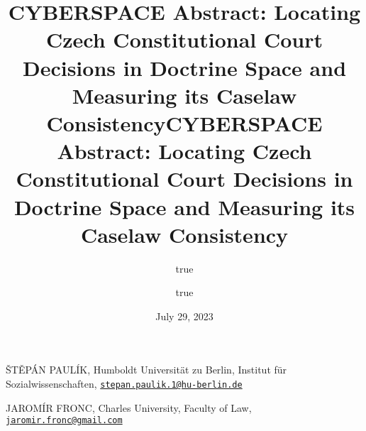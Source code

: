 \documentclass[
  11pt,
]{article}
\title{CYBERSPACE Abstract: Locating Czech Constitutional Court
Decisions in Doctrine Space and Measuring its Caselaw Consistency}
\author{true \and true}
\date{July 29, 2023}
\title{CYBERSPACE Abstract: Locating Czech Constitutional Court
Decisions in Doctrine Space and Measuring its Caselaw Consistency }
\date{}
\begin{document}



{%
\setlength{\parindent}{0pt}
\thispagestyle{plain}
{%
\maketitle  %

}




{
   \vskip 13.5pt\relax \normalsize\fontsize{11}{12}
   \MakeUppercase{Štěpán Paulík}, \small{Humboldt Universität zu Berlin,
Institut für Sozialwissenschaften,
\href{mailto:stepan.paulik.1@hu-berlin.de}{\nolinkurl{stepan.paulik.1@hu-berlin.de}}}   \par \vskip -3.5pt \MakeUppercase{Jaromír
Fronc}, \small{Charles University, Faculty of Law,
\href{mailto:jaromir.fronc@gmail.com}{\nolinkurl{jaromir.fronc@gmail.com}}}   

}

}
\end{document}
